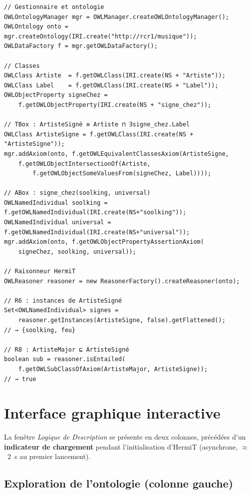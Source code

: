 \begin{lstlisting}[caption={Construction de la TBox et raisonnement HermiT}]
// Gestionnaire et ontologie
OWLOntologyManager mgr = OWLManager.createOWLOntologyManager();
OWLOntology onto = mgr.createOntology(IRI.create("http://rcr1/musique"));
OWLDataFactory f = mgr.getOWLDataFactory();

// Classes
OWLClass Artiste  = f.getOWLClass(IRI.create(NS + "Artiste"));
OWLClass Label    = f.getOWLClass(IRI.create(NS + "Label"));
OWLObjectProperty signeChez =
    f.getOWLObjectProperty(IRI.create(NS + "signe_chez"));

// TBox : ArtisteSigné ≡ Artiste ⊓ ∃signe_chez.Label
OWLClass ArtisteSigne = f.getOWLClass(IRI.create(NS + "ArtisteSigne"));
mgr.addAxiom(onto, f.getOWLEquivalentClassesAxiom(ArtisteSigne,
    f.getOWLObjectIntersectionOf(Artiste,
        f.getOWLObjectSomeValuesFrom(signeChez, Label))));

// ABox : signe_chez(soolking, universal)
OWLNamedIndividual soolking = f.getOWLNamedIndividual(IRI.create(NS+"soolking"));
OWLNamedIndividual universal = f.getOWLNamedIndividual(IRI.create(NS+"universal"));
mgr.addAxiom(onto, f.getOWLObjectPropertyAssertionAxiom(
    signeChez, soolking, universal));

// Raisonneur HermiT
OWLReasoner reasoner = new ReasonerFactory().createReasoner(onto);

// R6 : instances de ArtisteSigné
Set<OWLNamedIndividual> signes =
    reasoner.getInstances(ArtisteSigne, false).getFlattened();
// → {soolking, feu}

// R8 : ArtisteMajor ⊑ ArtisteSigné
boolean sub = reasoner.isEntailed(
    f.getOWLSubClassOfAxiom(ArtisteMajor, ArtisteSigne));
// → true
\end{lstlisting}

\section{Interface graphique interactive}

La fenêtre \emph{Logique de Description} se présente en deux colonnes,
précédées d'un \textbf{indicateur de chargement} pendant l'initialisation
d'HermiT (asynchrone, $\approx$~2~s au premier lancement).

\subsection{Exploration de l'ontologie (colonne gauche)}

